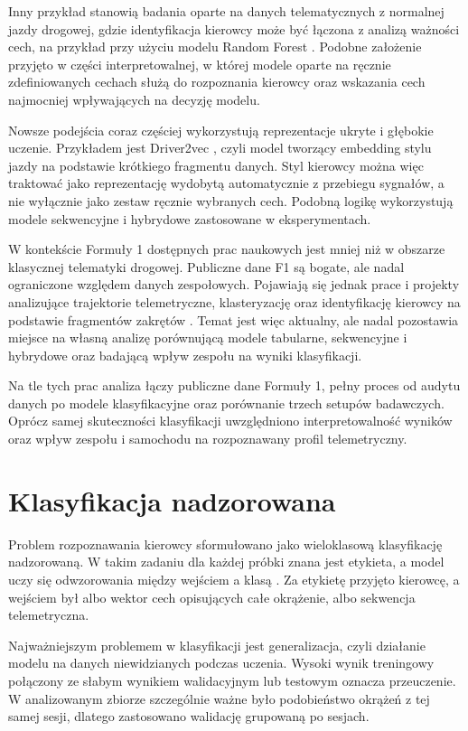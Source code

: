 \documentclass[printmode,pl]{mgr}
\begin{document}
Inny przykład stanowią badania oparte na danych telematycznych z normalnej jazdy drogowej, gdzie identyfikacja kierowcy może być łączona z analizą ważności cech, na przykład przy użyciu modelu Random Forest \cite{wang2017}. Podobne założenie przyjęto w części interpretowalnej, w której modele oparte na ręcznie zdefiniowanych cechach służą do rozpoznania kierowcy oraz wskazania cech najmocniej wpływających na decyzję modelu.

Nowsze podejścia coraz częściej wykorzystują reprezentacje ukryte i głębokie uczenie. Przykładem jest Driver2vec \cite{driver2vec}, czyli model tworzący embedding stylu jazdy na podstawie krótkiego fragmentu danych. Styl kierowcy można więc traktować jako reprezentację wydobytą automatycznie z przebiegu sygnałów, a nie wyłącznie jako zestaw ręcznie wybranych cech. Podobną logikę wykorzystują modele sekwencyjne i hybrydowe zastosowane w eksperymentach.

W kontekście Formuły 1 dostępnych prac naukowych jest mniej niż w obszarze klasycznej telematyki drogowej. Publiczne dane F1 są bogate, ale nadal ograniczone względem danych zespołowych. Pojawiają się jednak prace i projekty analizujące trajektorie telemetryczne, klasteryzację oraz identyfikację kierowcy na podstawie fragmentów zakrętów \cite{f1_fda_thesis,withseismic2026}. Temat jest więc aktualny, ale nadal pozostawia miejsce na własną analizę porównującą modele tabularne, sekwencyjne i hybrydowe oraz badającą wpływ zespołu na wyniki klasyfikacji.

Na tle tych prac analiza łączy publiczne dane Formuły 1, pełny proces od audytu danych po modele klasyfikacyjne oraz porównanie trzech setupów badawczych. Oprócz samej skuteczności klasyfikacji uwzględniono interpretowalność wyników oraz wpływ zespołu i samochodu na rozpoznawany profil telemetryczny.

\section{Klasyfikacja nadzorowana}

Problem rozpoznawania kierowcy sformułowano jako wieloklasową klasyfikację nadzorowaną. W takim zadaniu dla każdej próbki znana jest etykieta, a model uczy się odwzorowania między wejściem a klasą \cite{bishop2006}. Za etykietę przyjęto kierowcę, a wejściem był albo wektor cech opisujących całe okrążenie, albo sekwencja telemetryczna.

Najważniejszym problemem w klasyfikacji jest generalizacja, czyli działanie modelu na danych niewidzianych podczas uczenia. Wysoki wynik treningowy połączony ze słabym wynikiem walidacyjnym lub testowym oznacza przeuczenie. W analizowanym zbiorze szczególnie ważne było podobieństwo okrążeń z tej samej sesji, dlatego zastosowano walidację grupowaną po sesjach.
\end{document}

